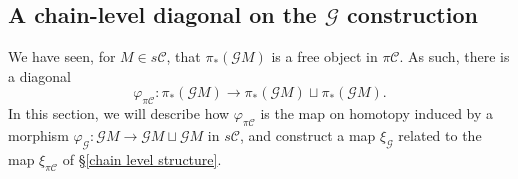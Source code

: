 \documentclass[11pt]{amsart} \renewcommand{\baselinestretch}{1.4}
\theoremstyle{plain}
\theoremstyle{definition}
\let\phi\varphi
\renewcommand{\to}{\longrightarrow}
\newcommand{\scrG}{\mathscr{G}}
\newcommand{\calc}{\mathcal{C}}
\newcommand{\BSW}{{\scrG}}
\newcommand{\PA}[1]{\pi#1}
\begin{document}
\begin{Composite functor spectral sequences}
\subsection{A chain-level diagonal on the $\BSW $ construction}
\label{Subsection: Chain level diagonal}
We have seen, for $M\in s\calc$, that $\pi_*(\BSW M)$ is a free object in $\PA{\calc}$. As such, there is a diagonal
\[\phi_{\PA{\calc}}:\pi_*(\BSW M)\to \pi_*(\BSW M)\sqcup \pi_*(\BSW M).\]
In this section, we will describe how $\phi_{\PA{\calc}}$ is the map on homotopy induced by a morphism $\phi_\BSW :\BSW M\to \BSW M\sqcup \BSW M$ in $s\calc$, and construct a map $\xi_{\BSW}$ related to the map $\xi_{\PA{\calc}}$ of \S\ref{chain level structure}. %


\end{Composite functor spectral sequences}
\end{document}
